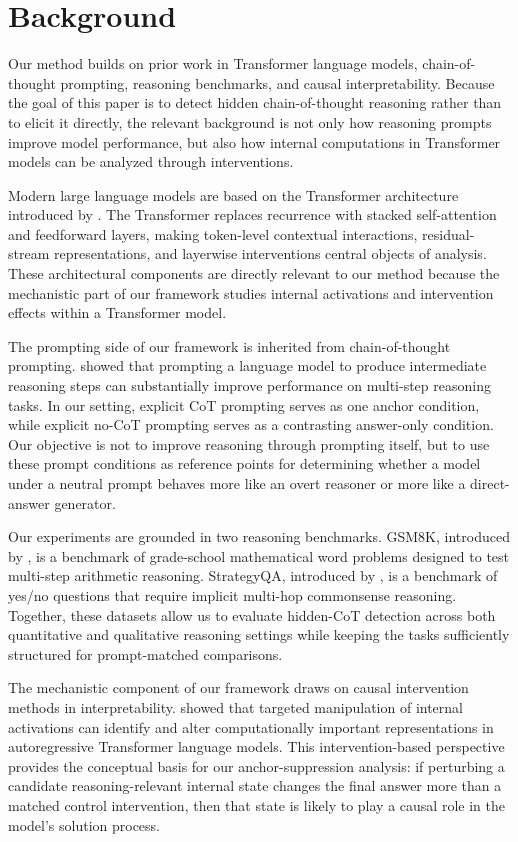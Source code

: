 \documentclass{article}
\theoremstyle{plain}
\theoremstyle{definition}
\theoremstyle{remark}
\begin{document}
\section{Background}

Our method builds on prior work in Transformer language models, chain-of-thought prompting, reasoning benchmarks, and causal interpretability. Because the goal of this paper is to detect hidden chain-of-thought reasoning rather than to elicit it directly, the relevant background is not only how reasoning prompts improve model performance, but also how internal computations in Transformer models can be analyzed through interventions.

Modern large language models are based on the Transformer architecture introduced by \citet{vaswani_attention_2023}. The Transformer replaces recurrence with stacked self-attention and feedforward layers, making token-level contextual interactions, residual-stream representations, and layerwise interventions central objects of analysis. These architectural components are directly relevant to our method because the mechanistic part of our framework studies internal activations and intervention effects within a Transformer model.

The prompting side of our framework is inherited from chain-of-thought prompting. \citet{wei_chain--thought_2023} showed that prompting a language model to produce intermediate reasoning steps can substantially improve performance on multi-step reasoning tasks. In our setting, explicit CoT prompting serves as one anchor condition, while explicit no-CoT prompting serves as a contrasting answer-only condition. Our objective is not to improve reasoning through prompting itself, but to use these prompt conditions as reference points for determining whether a model under a neutral prompt behaves more like an overt reasoner or more like a direct-answer generator.

Our experiments are grounded in two reasoning benchmarks. GSM8K, introduced by \citet{cobbe_training_2021}, is a benchmark of grade-school mathematical word problems designed to test multi-step arithmetic reasoning. StrategyQA, introduced by \citet{geva_did_2021}, is a benchmark of yes/no questions that require implicit multi-hop commonsense reasoning. Together, these datasets allow us to evaluate hidden-CoT detection across both quantitative and qualitative reasoning settings while keeping the tasks sufficiently structured for prompt-matched comparisons.

The mechanistic component of our framework draws on causal intervention methods in interpretability. \citet{meng_locating_2023} showed that targeted manipulation of internal activations can identify and alter computationally important representations in autoregressive Transformer language models. This intervention-based perspective provides the conceptual basis for our anchor-suppression analysis: if perturbing a candidate reasoning-relevant internal state changes the final answer more than a matched control intervention, then that state is likely to play a causal role in the model’s solution process.
\end{document}
